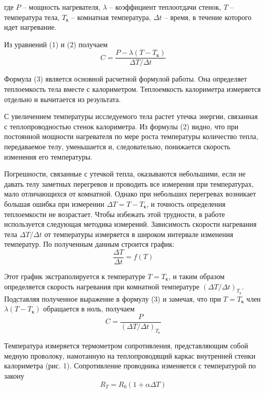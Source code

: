 где $P$ -- мощность нагревателя, $\lambda$ -- коэффициент теплоотдачи стенок, $T$ -- температура тела, $T_{\text{к}}$ -- комнатная температура, $ \Delta t$ -- время, в течение которого идет нагревание.

Из уравнений (1) и (2) получаем
\begin{equation}
	C = \dfrac{P - \lambda(T - T_{\text{к}})}{\Delta T / \Delta t}
\end{equation}

Формула (3) является основной расчетной формулой работы. Она определяет теплоемкость тела вместе с калориметром. Теплоемкость калориметра измеряется отдельно и вычитается из результата.

С увеличением температуры исследуемого тела растет утечка энергии, связанная с теплопроводностью стенок калориметра. Из формулы (2) видно, что при постоянной мощности нагревателя по мере роста температуры количество тепла, передаваемое телу, уменьшается и, следовательно, понижается скорость изменения его температуры.

Погрешности, связанные с утечкой тепла, оказываются небольшими, если не давать телу заметных перегревов и проводить все измерения при температурах, мало отличающихся от комнатной. Однако при небольших перегревах возникает большая ошибка при измерении $\Delta T = T - T_\text{к}$, и точность определения теплоемкости не возрастает. Чтобы избежать этой трудности, в работе используется следующая методика измерений. Зависимость скорости нагревания тела $\Delta T / \Delta t$ от температуры измеряется в широком интервале изменения температур. По полученным данным строится график:
\begin{equation}
	\dfrac{\Delta T}{\Delta t} = f(T)
\end{equation}

Этот график экстраполируется к температуре $T = T_{\text{к}}$, и таким образом определяется скорость нагревания при комнатной температуре $(\Delta T / \Delta t)_{T_{\text{к}}}$. Подставляя полученное выражение в формулу (3) и замечая, что при $T = T_{\text{к}}$ член $\lambda(T - T_{\text{к}})$ обращается в ноль, получаем
\begin{equation}
	C = \dfrac{P}{(\Delta T / \Delta t)_{T_{\text{к}}}}
\end{equation}

Температура измеряется термометром сопротивления, представляющим собой медную проволоку, намотанную на теплопроводящий каркас внутренней стенки калориметра (рис. 1). Сопротивление проводника изменяется с температурой по закону
\begin{equation}
    R_{T} = R_{0}(1 + \alpha \Delta T)
\end{equation}
    

